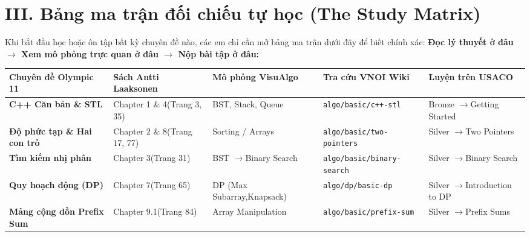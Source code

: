 \documentclass[11pt,a4paper]{article}
\begin{document}
\newpage

\section*{\color{AsianDarkBlue}\large III. Bảng ma trận đối chiếu tự học (The Study Matrix)}

Khi bắt đầu học hoặc ôn tập bất kỳ chuyên đề nào, các em chỉ cần mở bảng ma trận dưới đây để biết chính xác: \textbf{Đọc lý thuyết ở đâu $\to$ Xem mô phỏng trực quan ở đâu $\to$ Nộp bài tập ở đâu:}

\vspace{0.15cm}

\begin{center}
\small
\begin{tabular}{@{}p{3.8cm}p{3.2cm}p{3.2cm}p{3.5cm}p{3.2cm}@{}}
\toprule
\textbf{Chuyên đề Olympic 11} & \textbf{Sách Antti Laaksonen} & \textbf{Mô phỏng VisuAlgo} & \textbf{Tra cứu VNOI Wiki} & \textbf{Luyện trên USACO} \\ \midrule
\textbf{C++ Căn bản \& STL} & Chapter 1 \& 4\newline (Trang 3, 35) & BST, Stack, Queue & \texttt{algo/basic/}\newline\texttt{c++-stl} & Bronze $\to$\newline Getting Started \\
\addlinespace[4pt]
\textbf{Độ phức tạp \& Hai con trỏ} & Chapter 2 \& 8\newline (Trang 17, 77) & Sorting / Arrays & \texttt{algo/basic/}\newline\texttt{two-pointers} & Silver $\to$\newline Two Pointers \\
\addlinespace[4pt]
\textbf{Tìm kiếm nhị phân} & Chapter 3\newline (Trang 31) & BST $\to$\newline Binary Search & \texttt{algo/basic/}\newline\texttt{binary-search} & Silver $\to$\newline Binary Search \\
\addlinespace[4pt]
\textbf{Quy hoạch động (DP)} & Chapter 7\newline (Trang 65) & DP (Max Subarray,\newline Knapsack) & \texttt{algo/dp/}\newline\texttt{basic-dp} & Silver $\to$\newline Introduction to DP \\
\addlinespace[4pt]
\textbf{Mảng cộng dồn Prefix Sum} & Chapter 9.1\newline (Trang 84) & Array Manipulation & \texttt{algo/basic/}\newline\texttt{prefix-sum} & Silver $\to$\newline Prefix Sums \\

\end{tabular}
\end{center}
\end{document}
